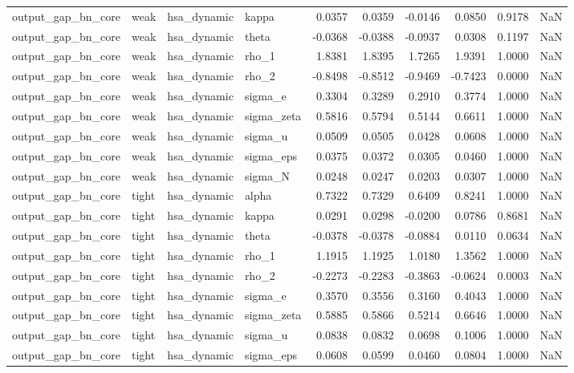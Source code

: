 \begin{tabular}{llllrrrrrl}
output\_gap\_bn\_core & weak & hsa\_dynamic & kappa & 0.0357 & 0.0359 & -0.0146 & 0.0850 & 0.9178 & NaN \\
output\_gap\_bn\_core & weak & hsa\_dynamic & theta & -0.0368 & -0.0388 & -0.0937 & 0.0308 & 0.1197 & NaN \\
output\_gap\_bn\_core & weak & hsa\_dynamic & rho\_1 & 1.8381 & 1.8395 & 1.7265 & 1.9391 & 1.0000 & NaN \\
output\_gap\_bn\_core & weak & hsa\_dynamic & rho\_2 & -0.8498 & -0.8512 & -0.9469 & -0.7423 & 0.0000 & NaN \\
output\_gap\_bn\_core & weak & hsa\_dynamic & sigma\_e & 0.3304 & 0.3289 & 0.2910 & 0.3774 & 1.0000 & NaN \\
output\_gap\_bn\_core & weak & hsa\_dynamic & sigma\_zeta & 0.5816 & 0.5794 & 0.5144 & 0.6611 & 1.0000 & NaN \\
output\_gap\_bn\_core & weak & hsa\_dynamic & sigma\_u & 0.0509 & 0.0505 & 0.0428 & 0.0608 & 1.0000 & NaN \\
output\_gap\_bn\_core & weak & hsa\_dynamic & sigma\_eps & 0.0375 & 0.0372 & 0.0305 & 0.0460 & 1.0000 & NaN \\
output\_gap\_bn\_core & weak & hsa\_dynamic & sigma\_N & 0.0248 & 0.0247 & 0.0203 & 0.0307 & 1.0000 & NaN \\
output\_gap\_bn\_core & tight & hsa\_dynamic & alpha & 0.7322 & 0.7329 & 0.6409 & 0.8241 & 1.0000 & NaN \\
output\_gap\_bn\_core & tight & hsa\_dynamic & kappa & 0.0291 & 0.0298 & -0.0200 & 0.0786 & 0.8681 & NaN \\
output\_gap\_bn\_core & tight & hsa\_dynamic & theta & -0.0378 & -0.0378 & -0.0884 & 0.0110 & 0.0634 & NaN \\
output\_gap\_bn\_core & tight & hsa\_dynamic & rho\_1 & 1.1915 & 1.1925 & 1.0180 & 1.3562 & 1.0000 & NaN \\
output\_gap\_bn\_core & tight & hsa\_dynamic & rho\_2 & -0.2273 & -0.2283 & -0.3863 & -0.0624 & 0.0003 & NaN \\
output\_gap\_bn\_core & tight & hsa\_dynamic & sigma\_e & 0.3570 & 0.3556 & 0.3160 & 0.4043 & 1.0000 & NaN \\
output\_gap\_bn\_core & tight & hsa\_dynamic & sigma\_zeta & 0.5885 & 0.5866 & 0.5214 & 0.6646 & 1.0000 & NaN \\
output\_gap\_bn\_core & tight & hsa\_dynamic & sigma\_u & 0.0838 & 0.0832 & 0.0698 & 0.1006 & 1.0000 & NaN \\
output\_gap\_bn\_core & tight & hsa\_dynamic & sigma\_eps & 0.0608 & 0.0599 & 0.0460 & 0.0804 & 1.0000 & NaN \\

\end{tabular}
